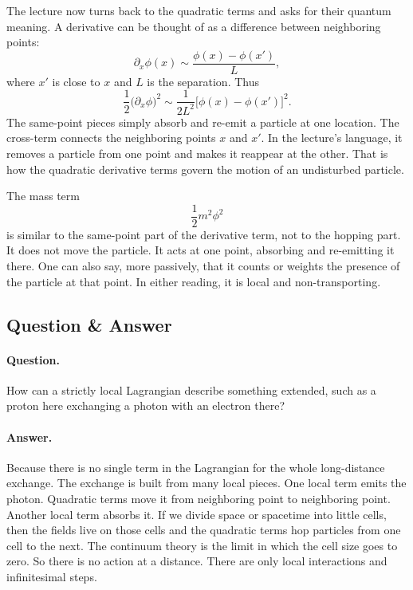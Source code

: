 The lecture now turns back to the quadratic terms and asks for their quantum meaning. A derivative can be thought of as a difference between neighboring points:
\begin{equation}
\partial_x\phi(x)\sim \frac{\phi(x)-\phi(x')}{L},
\end{equation}
where \(x'\) is close to \(x\) and \(L\) is the separation. Thus
\begin{equation}
\frac12\bigl(\partial_x\phi\bigr)^2
\sim
\frac{1}{2L^2}\bigl[\phi(x)-\phi(x')\bigr]^2.
\end{equation}
The same-point pieces simply absorb and re-emit a particle at one location. The cross-term connects the neighboring points \(x\) and \(x'\). In the lecture's language, it removes a particle from one point and makes it reappear at the other. That is how the quadratic derivative terms govern the motion of an undisturbed particle.

The mass term
\begin{equation}
\frac12 m^2\phi^2
\end{equation}
is similar to the same-point part of the derivative term, not to the hopping part. It does not move the particle. It acts at one point, absorbing and re-emitting it there. One can also say, more passively, that it counts or weights the presence of the particle at that point. In either reading, it is local and non-transporting.

\subsection{Question \& Answer}

\paragraph{Question.}
How can a strictly local Lagrangian describe something extended, such as a proton here exchanging a photon with an electron there?

\paragraph{Answer.}
Because there is no single term in the Lagrangian for the whole long-distance exchange. The exchange is built from many local pieces. One local term emits the photon. Quadratic terms move it from neighboring point to neighboring point. Another local term absorbs it. If we divide space or spacetime into little cells, then the fields live on those cells and the quadratic terms hop particles from one cell to the next. The continuum theory is the limit in which the cell size goes to zero. So there is no action at a distance. There are only local interactions and infinitesimal steps.

